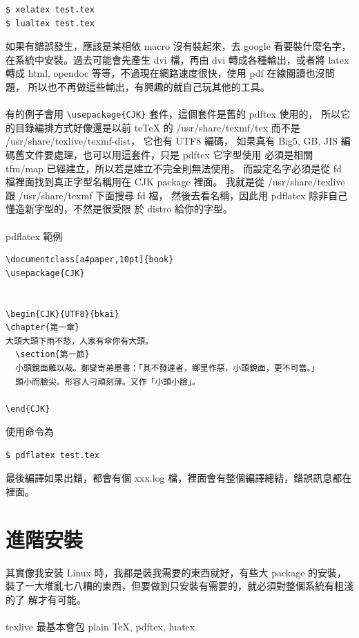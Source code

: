 \begin{verbatim}
$ xelatex test.tex
$ lualtex test.tex
\end{verbatim}

如果有錯誤發生，應該是某相依 macro 沒有裝起來，去 google 看要裝什麼名字，
在系統中安裝。過去可能會先產生 dvi 檔，再由 dvi 轉成各種輸出，或者將 latex 
轉成 html, opendoc 等等，不過現在網路速度很快，使用 pdf 在線閱讀也沒問題，
所以也不再做這些輸出，有興趣的就自己玩其他的工具。
\\\\
有的例子會用 \verb=\usepackage{CJK}= 套件，這個套件是舊的 pdftex 使用的，
所以它的目錄編排方式好像還是以前 teTeX 的 /usr/share/texmf/tex 而不是
/usr/share/texlive/texmf-dist， 它也有 UTF8 編碼， 如果真有 Big5, 
GB, JIS 編碼舊文件要處理，也可以用這套件，只是 pdftex 它字型使用
必須是相關 tfm/map 已經建立，所以若是建立不完全則無法使用。
而設定名字必須是從 fd 檔裡面找到真正字型名稱用在 CJK package 裡面。
我就是從 /usr/share/texlive 跟 /usr/share/texmf 下面搜尋 fd 檔，
然後去看名稱，因此用 pdflatex 除非自己懂造新字型的，不然是很受限
於 distro 給你的字型。
\\\\
pdflatex 範例

\begin{verbatim}
\documentclass[a4paper,10pt]{book}
\usepackage{CJK}


\begin{CJK}{UTF8}{bkai}
\chapter{第一章}
大頭大頭下雨不愁，人家有傘你有大頭。
  \section{第一節}
  小頭銳面難以哉。鄭燮寄弟墨書：「其不發達者，鄉里作惡，小頭銳面，更不可當。」
  頭小而臉尖。形容人刁頑刻薄。又作「小頭小臉」。

\end{CJK}

\end{verbatim}
使用命令為 
\begin{verbatim}
$ pdflatex test.tex
\end{verbatim}
最後編譯如果出錯，都會有個 xxx.log 檔，裡面會有整個編譯總結，錯誤訊息都在裡面。

\section{進階安裝}
其實像我安裝 Linux 時，我都是裝我需要的東西就好，有些大 package 的安裝，
裝了一大堆亂七八糟的東西，但要做到只安裝有需要的，就必須對整個系統有粗淺的了
解才有可能。
\\\\
texlive 最基本會包 plain \TeX, pdftex, luatex
